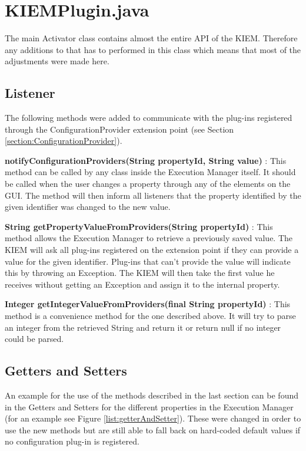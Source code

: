 \section{KIEMPlugin.java}
\label{section:ConfChangesKiemPlugin}
The main Activator class contains almost the entire \ac{API} of the \ac{KIEM}.
Therefore any additions to that has to performed in this class which means that
most of the adjustments were made here.

\subsection{Listener}
The following methods were added to communicate with the plug-ins registered through
the ConfigurationProvider extension point (see Section \ref{section:ConfigurationProvider}).
\begin{description}
 \item \textbf{notifyConfigurationProviders(String propertyId, String value)} : This method can be called by any class
inside the Execution Manager itself. It should be called when the user changes a property through any of
the elements on the \ac{GUI}. The method will then inform all listeners that the property identified by the
given identifier was changed to the new value.
 \item \textbf{String getPropertyValueFromProviders(String propertyId)} : This method allows the Execution Manager to
retrieve a previously saved value. The \ac{KIEM} will ask all plug-ins registered on the extension point if they
can provide a value for the given identifier. Plug-ins that can't provide the value will indicate this by throwing
an Exception. The \ac{KIEM} will then take the first value he receives without getting an Exception and assign it
to the internal property.
 \item \textbf{Integer getIntegerValueFromProviders(final String propertyId)} : This method is a convenience method for
the one described above. It will try to parse an integer from the retrieved String and return it or return null
if no integer could be parsed.
\end{description}

\subsection{Getters and Setters}
An example for the use of the methods described in the last section can be found in the Getters and Setters for
the different properties in the Execution Manager (for an example see Figure \ref{list:getterAndSetter}). 
These were changed in order to use the new methods but are
still able to fall back on hard-coded default values if no configuration plug-in is registered.

